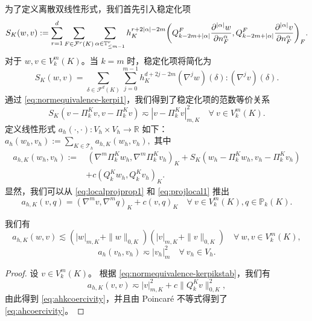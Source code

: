 为了定义离散双线性形式，我们首先引入稳定化项
$$
S_K(w,v):=\sum_{r=1}^{d}\sum_{F\in\mathcal F^{r}(K)}\sum_{\alpha\in
\mathbb{T}^{r}_{\leq
m-1}}h_K^{r+2|\alpha|-2m}\bigg(Q_{k-2m+|\alpha|}^{F}\frac{\partial^{|\alpha|}w}{\partial
n_{F}^{\alpha}},Q_{k-2m+|\alpha|}^{F}\frac{\partial^{|\alpha|}v}{\partial
n_{F}^{\alpha}}\bigg)_{F}.
$$
对于 $w,v\in V_{k}^{m}(K)$。当 $k=m$ 时，稳定化项将简化为
$$
S_K(w,v)=\sum_{\delta\in\mathcal F^d(K)}\sum_{j=0}^{m-1}h_K^{d+2j-2m}(\nabla^jw)(\delta):(\nabla^jv)(\delta).
$$
通过 \eqref{eq:normequivalence-kerpi1}，我们得到了稳定化项的范数等价关系
\begin{equation}\label{eq:normequivalence-kerpikstab}
S_K(v-\Pi_k^Kv,v-\Pi_k^Kv)\eqsim |v-\Pi_k^Kv|_{m,K}^2\quad\forall~v\in V_{k}^{m}(K).
\end{equation}
定义线性形式 $a_h(\cdot, \cdot): V_h\times V_h\to\mathbb R$ 如下：
$\displaystyle
a_h(w_h, v_h):=\sum_{K\in\mathcal T_h}a_{h,K}(w_h, v_h),
$
其中
\begin{align*}
a_{h,K}(w_h, v_h):=&\,(\nabla^m\Pi_k^Kw_h, \nabla^m\Pi_k^Kv_h)_K+S_K(w_h-\Pi_k^Kw_h,v_h-\Pi_k^Kv_h) \\
&+c(Q_k^Kw_h, Q_k^Kv_h)_K.
\end{align*}
显然，我们可以从 \eqref{eq:localprojprop1} 和 \eqref{eq:projlocal1} 推出
\begin{equation}\label{eq:ahKprop1}
a_{h,K}(v, q)=(\nabla^mv, \nabla^m q)_K+c(v,  q)_K\quad\forall~v\in V_{k}^{m}(K), q\in \mathbb P_{k}(K).
\end{equation}

\begin{lemma}
我们有
\begin{equation}\label{eq:ahkcoercivity}
a_{h,K}(w, v)\lesssim (|w|_{m,K}+\|w\|_{0,K})(|v|_{m,K}+\|v\|_{0,K})\quad\forall~w,v\in V_{k}^{m}(K),
\end{equation}
\begin{equation}\label{eq:ahcoercivity}
a_{h}(v_h, v_h)\eqsim |v_h|_{m}^2\quad\forall~v_h\in V_h.
\end{equation}
\end{lemma}
\begin{proof}
设 $v\in V_{k}^{m}(K)$。
根据 \eqref{eq:normequivalence-kerpikstab}，我们有
$$
a_{h,K}(v, v)\eqsim |v|_{m,K}^2+c\|Q_k^Kv\|_{0,K}^2,
$$
由此得到 \eqref{eq:ahkcoercivity}，并且由 Poincar\'e 不等式得到了 \eqref{eq:ahcoercivity}。
\end{proof}

